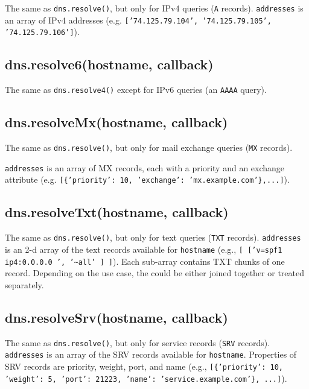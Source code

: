 The same as \texttt{dns.resolve()}, but only for IPv4 queries
(\texttt{A} records). \texttt{addresses} is an array of IPv4 addresses
(e.g. \texttt{{[}'74.125.79.104', '74.125.79.105', '74.125.79.106'{]}}).

\subsection{dns.resolve6(hostname,
callback)}\label{dns.resolve6hostname-callback}

The same as \texttt{dns.resolve4()} except for IPv6 queries (an
\texttt{AAAA} query).

\subsection{dns.resolveMx(hostname,
callback)}\label{dns.resolvemxhostname-callback}

The same as \texttt{dns.resolve()}, but only for mail exchange queries
(\texttt{MX} records).

\texttt{addresses} is an array of MX records, each with a priority and
an exchange attribute (e.g.
\texttt{{[}\{'priority': 10, 'exchange': 'mx.example.com'\},...{]}}).

\subsection{dns.resolveTxt(hostname,
callback)}\label{dns.resolvetxthostname-callback}

The same as \texttt{dns.resolve()}, but only for text queries
(\texttt{TXT} records). \texttt{addresses} is an 2-d array of the text
records available for \texttt{hostname} (e.g.,
\texttt{{[} {[}'v=spf1 ip4:0.0.0.0 ', '\textasciitilde{}all' {]} {]}}).
Each sub-array contains TXT chunks of one record. Depending on the use
case, the could be either joined together or treated separately.

\subsection{dns.resolveSrv(hostname,
callback)}\label{dns.resolvesrvhostname-callback}

The same as \texttt{dns.resolve()}, but only for service records
(\texttt{SRV} records). \texttt{addresses} is an array of the SRV
records available for \texttt{hostname}. Properties of SRV records are
priority, weight, port, and name (e.g.,
\texttt{{[}\{'priority': 10, 'weight': 5, 'port': 21223, 'name': 'service.example.com'\}, ...{]}}).

